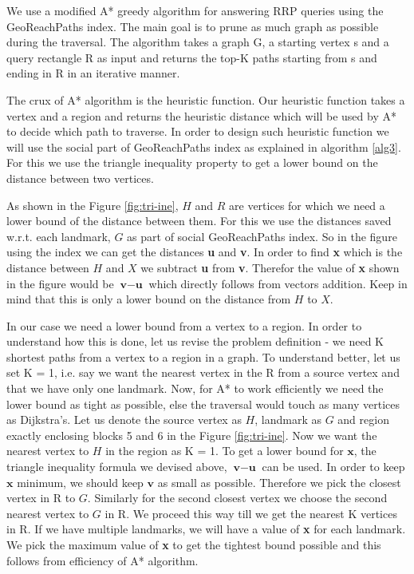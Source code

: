 {We use a modified A* greedy algorithm for answering RRP queries using the GeoReachPaths index. The main goal is to prune as much graph as possible during the traversal. The algorithm takes a graph G, a starting vertex s and a query rectangle R as input and returns the top-K paths starting from s and ending in R in an iterative manner.

The crux of A* algorithm is the heuristic function. Our heuristic function takes a vertex and a region and returns the heuristic distance which will be used by A* to decide which path to traverse. In order to design such heuristic function we will use the social part of GeoReachPaths index as explained in algorithm \ref{alg3}. For this we use the triangle inequality property to get a lower bound on the distance between two vertices.

As shown in the Figure \ref{fig:tri-ine}, $H$ and $R$ are vertices for which we need a lower bound of the distance between them. For this we use the distances saved w.r.t. each landmark, $G$ as part of social GeoReachPaths index. So in the figure using the index we can get the distances \textbf{u} and \textbf{v}. In order to find \textbf{x} which is the distance between $H$ and $X$ we subtract \textbf{u} from \textbf{v}. Therefor the value of \textbf{x} shown in the figure would be $\textbf{v} - \textbf{u}$ which directly follows from vectors addition. Keep in mind that this is only a lower bound on the distance from $H$ to $X$.

In our case we need a lower bound from a vertex to a region. In order to understand how this is done, let us revise the problem definition - we need K shortest paths from a vertex to a region in a graph. To understand better, let us set K = 1, i.e. say we want the nearest vertex in the R from a source vertex and that we have only one landmark. Now, for A* to work efficiently we need the lower bound as tight as possible, else the traversal would touch as many vertices as Dijkstra's. Let us denote the source vertex as $H$, landmark as $G$ and region exactly enclosing blocks 5 and 6 in the Figure \ref{fig:tri-ine}. Now we want the nearest vertex to $H$ in the region as K = 1. To get a lower bound for $\textbf{x}$, the triangle inequality formula we devised above, $\textbf{v} - \textbf{u}$ can be used. In order to keep $\textbf{x}$ minimum, we should keep $\textbf{v}$ as small as possible. Therefore we pick the closest vertex in R to $G$. Similarly for the second closest vertex we choose the second nearest vertex to $G$ in R. We proceed this way till we get the nearest K vertices in R. If we have multiple landmarks, we will have a value of \textbf{x} for each landmark. We pick the maximum value of \textbf{x} to get the tightest bound possible and this follows from efficiency of A* algorithm.

}

